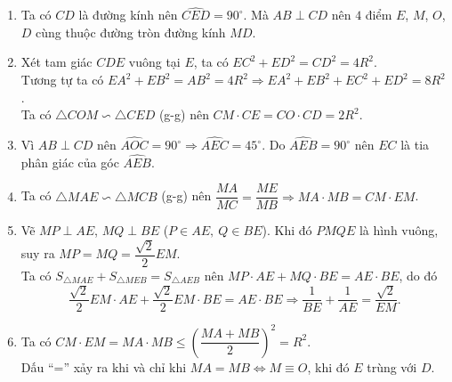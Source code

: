 \begin{bt}
{\begin{center}
		\end{center}
		\begin{enumerate}
			\item Ta có $ CD $ là đường kính nên $ \widehat{CED}=90^{\circ} $. Mà $ AB\perp CD $ nên $ 4 $ điểm $ E $, $ M $, $ O $, $ D $ cùng thuộc đường tròn đường kính $ MD $.
			\item Xét tam giác $ CDE $ vuông tại $ E $, ta có $ EC^{2}+ED^{2}=CD^{2}=4R^{2} $.\\
			Tương tự ta có $ EA^{2}+EB^{2}=AB^{2}=4R^{2}\Rightarrow EA^{2}+EB^{2}+EC^{2}+ED^{2}=8R^{2} $.\\
			Ta có $ \triangle COM\backsim \triangle CED $ (g-g) nên $ CM\cdot CE=CO\cdot CD=2R^{2} $.
			\item Vì $ AB\perp CD $ nên $ \widehat{AOC}=90^{\circ}\Rightarrow \widehat{AEC}=45^{\circ} $. Do $ \widehat{AEB}=90^{\circ} $ nên $ EC $ là tia phân giác của góc $ \widehat{AEB} $.
			\item Ta có $ \triangle MAE\backsim\triangle MCB $ (g-g) nên $ \dfrac{MA}{MC}=\dfrac{ME}{MB}\Rightarrow MA\cdot MB=CM\cdot EM $.
			\item Vẽ $ MP\perp AE $, $ MQ\perp BE $ ($ P\in AE,\ Q\in BE $). Khi đó $ PMQE $ là hình vuông, suy ra $ MP=MQ=\dfrac{\sqrt{2}}{2}EM $.\\
			Ta có $ S_{\triangle MAE}+S_{\triangle MEB}=S_{\triangle AEB} $ nên $ MP\cdot AE+MQ\cdot BE=AE\cdot BE $, do đó
			\[
			\dfrac{\sqrt{2}}{2}EM\cdot AE+\dfrac{\sqrt{2}}{2}EM\cdot BE=AE\cdot BE\Rightarrow \dfrac{1}{BE}+\dfrac{1}{AE}=\dfrac{\sqrt{2}}{EM}.
			\]
			\item Ta có $ CM\cdot EM=MA\cdot MB\leq \left(\dfrac{MA+MB}{2}\right)^{2}=R^{2} $.\\
			Dấu ``='' xảy ra khi và chỉ khi $ MA=MB\Leftrightarrow M \equiv O $, khi đó $ E $ trùng với $ D $.\\

\end{enumerate}}
\end{bt}
